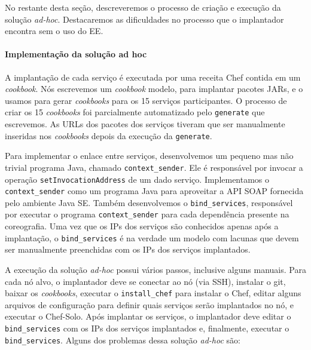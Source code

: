 No restante desta seção, descreveremos o processo de criação e execução
da solução \emph{ad-hoc}. Destacaremos as dificuldades no processo
que o implantador encontra sem o uso do EE.

\paragraph{Implementação da solução ad hoc}
A implantação de cada serviço é executada por uma receita Chef contida em um \emph{cookbook}.
Nós escrevemos um \emph{cookbook} modelo, para implantar pacotes JARs,
e o usamos para gerar \emph{cookbooks} para os 15 serviços participantes.
O processo de criar os 15 \emph{cookbooks} foi parcialmente automatizado
pelo \script \texttt{generate} que escrevemos.
As URLs dos pacotes dos serviços tiveram que ser manualmente inseridas nos
\emph{cookbooks} depois da execução da \script \texttt{generate}.

Para implementar o enlace entre serviços,
desenvolvemos um pequeno mas não trivial programa Java, chamado \texttt{context\_sender}. 
Ele é responsável por invocar a operação \texttt{setInvocationAddress} de um dado serviço.
Implementamos o \texttt{context\_sender} como um programa Java para
aproveitar a API SOAP fornecida pelo ambiente Java SE.
Também desenvolvemos o \script \texttt{bind\_services},
responsável por executar o programa \texttt{context\_sender}
para cada dependência presente na coreografia.
Uma vez que os IPs dos serviços são conhecidos apenas após a implantação,
o \script \texttt{bind\_services} é na verdade um modelo com lacunas
que devem ser manualmente preenchidas com os IPs dos serviços implantados.

A execução da solução \emph{ad-hoc} possui vários passos,
inclusive alguns manuais.
Para cada nó alvo, o implantador deve se conectar ao nó (via SSH),
instalar o git, baixar os \emph{cookbooks}, executar o \script \texttt{install\_chef} 
para instalar o Chef, editar alguns arquivos de configuração para definir
quais serviços serão implantados no nó, e executar o Chef-Solo.
Após implantar os serviços, o implantador deve editar o \script
\texttt{bind\_services} com os IPs dos serviços implantados
e, finalmente, executar o \script \texttt{bind\_services}.
Alguns dos problemas dessa solução \emph{ad-hoc} são:

